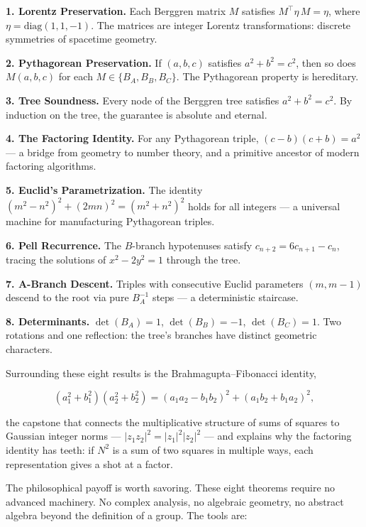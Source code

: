 \textbf{1. Lorentz Preservation.} Each Berggren matrix \(M\) satisfies \(M^\top \eta\, M = \eta\), where \(\eta = \mathrm{diag}(1, 1, -1)\). The matrices are integer Lorentz transformations: discrete symmetries of spacetime geometry.

\textbf{2. Pythagorean Preservation.} If \((a, b, c)\) satisfies \(a^2 + b^2 = c^2\), then so does \(M(a, b, c)\) for each \(M \in \{B_A, B_B, B_C\}\). The Pythagorean property is hereditary.

\textbf{3. Tree Soundness.} Every node of the Berggren tree satisfies \(a^2 + b^2 = c^2\). By induction on the tree, the guarantee is absolute and eternal.

\textbf{4. The Factoring Identity.} For any Pythagorean triple, \((c - b)(c + b) = a^2\) --- a bridge from geometry to number theory, and a primitive ancestor of modern factoring algorithms.

\textbf{5. Euclid's Parametrization.} The identity \((m^2 - n^2)^2 + (2mn)^2 = (m^2 + n^2)^2\) holds for all integers --- a universal machine for manufacturing Pythagorean triples.

\textbf{6. Pell Recurrence.} The \(B\)-branch hypotenuses satisfy \(c_{n+2} = 6c_{n+1} - c_n\), tracing the solutions of \(x^2 - 2y^2 = 1\) through the tree.

\textbf{7. A-Branch Descent.} Triples with consecutive Euclid parameters \((m, m-1)\) descend to the root via pure \(B_A^{-1}\) steps --- a deterministic staircase.

\textbf{8. Determinants.} \(\det(B_A) = 1\), \(\det(B_B) = -1\), \(\det(B_C) = 1\). Two rotations and one reflection: the tree's branches have distinct geometric characters.

Surrounding these eight results is the Brahmagupta--Fibonacci identity,

\[(a_1^2 + b_1^2)(a_2^2 + b_2^2) = (a_1 a_2 - b_1 b_2)^2 + (a_1 b_2 + b_1 a_2)^2,\]

the capstone that connects the multiplicative structure of sums of squares to Gaussian integer norms --- \(|z_1 z_2|^2 = |z_1|^2 |z_2|^2\) --- and explains why the factoring identity has teeth: if \(N^2\) is a sum of two squares in multiple ways, each representation gives a shot at a factor.

The philosophical payoff is worth savoring. These eight theorems require no advanced machinery. No complex analysis, no algebraic geometry, no abstract algebra beyond the definition of a group. The tools are:

